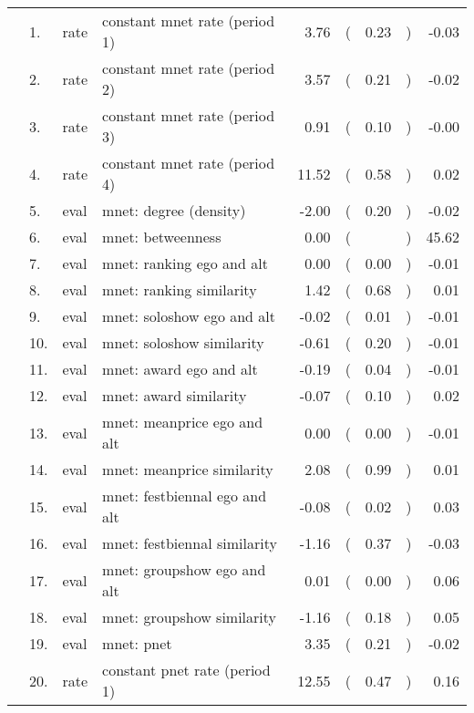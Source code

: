 \begin{table}[ht]
\centering
\begin{tabular}{llllrlrlr}
  \hline
  \hline
  &  1. & rate & constant mnet rate (period 1) & 3.76 & ( & 0.23 & ) & -0.03 \\ 
    &  2. & rate & constant mnet rate (period 2) & 3.57 & ( & 0.21 & ) & -0.02 \\ 
    &  3. & rate & constant mnet rate (period 3) & 0.91 & ( & 0.10 & ) & -0.00 \\ 
    &  4. & rate & constant mnet rate (period 4) & 11.52 & ( & 0.58 & ) & 0.02 \\ 
    &  5. & eval & mnet: degree (density) & -2.00 & ( & 0.20 & ) & -0.02 \\ 
    &  6. & eval & mnet: betweenness & 0.00 & ( &  & ) & 45.62 \\ 
    &  7. & eval & mnet: ranking ego and alt & 0.00 & ( & 0.00 & ) & -0.01 \\ 
    &  8. & eval & mnet: ranking similarity & 1.42 & ( & 0.68 & ) & 0.01 \\ 
    &  9. & eval & mnet: soloshow ego and alt & -0.02 & ( & 0.01 & ) & -0.01 \\ 
    & 10. & eval & mnet: soloshow similarity & -0.61 & ( & 0.20 & ) & -0.01 \\ 
    & 11. & eval & mnet: award ego and alt & -0.19 & ( & 0.04 & ) & -0.01 \\ 
    & 12. & eval & mnet: award similarity & -0.07 & ( & 0.10 & ) & 0.02 \\ 
    & 13. & eval & mnet: meanprice ego and alt & 0.00 & ( & 0.00 & ) & -0.01 \\ 
    & 14. & eval & mnet: meanprice similarity & 2.08 & ( & 0.99 & ) & 0.01 \\ 
    & 15. & eval & mnet: festbiennal ego and alt & -0.08 & ( & 0.02 & ) & 0.03 \\ 
    & 16. & eval & mnet: festbiennal similarity & -1.16 & ( & 0.37 & ) & -0.03 \\ 
    & 17. & eval & mnet: groupshow ego and alt & 0.01 & ( & 0.00 & ) & 0.06 \\ 
    & 18. & eval & mnet: groupshow similarity & -1.16 & ( & 0.18 & ) & 0.05 \\ 
    & 19. & eval & mnet: pnet & 3.35 & ( & 0.21 & ) & -0.02 \\ 
    & 20. & rate & constant pnet rate (period 1) & 12.55 & ( & 0.47 & ) & 0.16 \\ 

\end{tabular}
\end{table}
